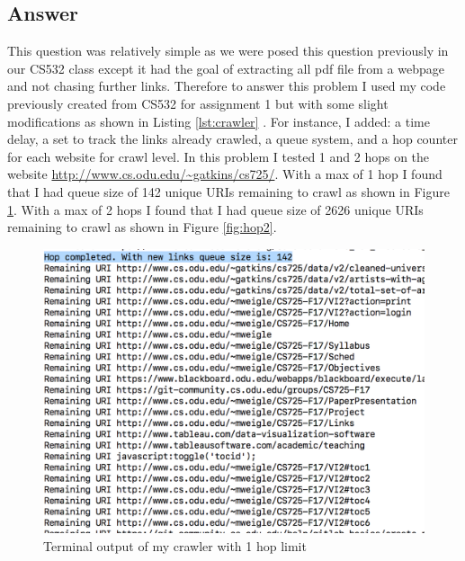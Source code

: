 \documentclass[letterpaper,11pt]{article}
\newcommand*{\srcPath}{../src}%
\begin{document}
\subsection*{Answer}

This question was relatively simple as we were posed this question previously in our CS532 class except it had the goal of extracting all pdf file from a webpage and not chasing further links.
Therefore to answer this problem I used my code previously created from CS532 for assignment 1 but with some slight modifications as shown in Listing \ref{lst:crawler} \cite{cs532}.
For instance, I added: a time delay, a set to track the links already crawled, a queue system, and a hop counter for each website for crawl level.
In this problem I tested 1 and 2 hops on the website \url{http://www.cs.odu.edu/~gatkins/cs725/}. 
With a max of 1 hop I found that I had queue size of 142 unique URIs remaining to crawl as shown in Figure \ref{fig:hop1}.
With a max of 2 hops I found that I had queue size of 2626 unique URIs remaining to crawl as shown in Figure \ref{fig:hop2}.

 

\clearpage

\begin{figure}[h]
\centering
\includegraphics[scale=0.43]{hop1.png}
\caption{Terminal output of my crawler with 1 hop limit}
\label{fig:hop1}
\end{figure}
\end{document}

